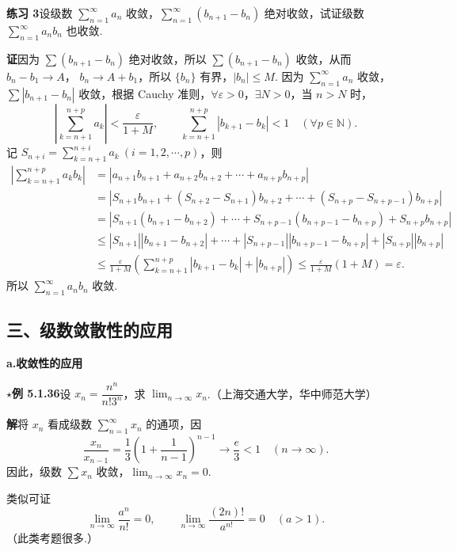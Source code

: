 \documentclass[UTF8, 12pt, fontset=fandol, oneside]{ctexart}
\begin{document}
\noindent\textbf{练习 3}\quad 设级数 $\displaystyle\sum_{n=1}^{\infty}a_n$ 收敛，$\displaystyle\sum_{n=1}^{\infty}(b_{n+1}-b_n)$ 绝对收敛，试证级数
$\displaystyle\sum_{n=1}^{\infty}a_nb_n$ 也收敛.

\noindent\textbf{证}\quad 因为 $\displaystyle\sum(b_{n+1}-b_n)$ 绝对收敛，所以
$\displaystyle\sum(b_{n+1}-b_n)$ 收敛，从而 $b_n-b_1\to A$，
$b_n\to A+b_1$，所以 $\{b_n\}$ 有界，$|b_n|\le M$. 因为
$\displaystyle\sum_{n=1}^{\infty}a_n$ 收敛，$\displaystyle\sum|b_{n+1}-b_n|$ 收敛，根据 Cauchy 准则，$\forall\varepsilon>0$，$\exists N>0$，当 $n>N$ 时，
\[
  \left|\sum_{k=n+1}^{n+p}a_k\right|<\frac{\varepsilon}{1+M},
  \qquad
  \sum_{k=n+1}^{n+p}|b_{k+1}-b_k|<1\quad(\forall p\in\mathbb N).
\]
记 $S_{n+i}=\displaystyle\sum_{k=n+1}^{n+i}a_k\ (i=1,2,\cdots,p)$，则
\[
\begin{aligned}
  \left|\sum_{k=n+1}^{n+p}a_kb_k\right|
  &=|a_{n+1}b_{n+1}+a_{n+2}b_{n+2}+\cdots+a_{n+p}b_{n+p}|\\
  &=|S_{n+1}b_{n+1}+(S_{n+2}-S_{n+1})b_{n+2}
     +\cdots+(S_{n+p}-S_{n+p-1})b_{n+p}|\\
  &=|S_{n+1}(b_{n+1}-b_{n+2})+\cdots
    +S_{n+p-1}(b_{n+p-1}-b_{n+p})+S_{n+p}b_{n+p}|\\
  &\le |S_{n+1}||b_{n+1}-b_{n+2}|+\cdots
    +|S_{n+p-1}||b_{n+p-1}-b_{n+p}|+|S_{n+p}||b_{n+p}|\\
  &\le \frac{\varepsilon}{1+M}
    \left(\sum_{k=n+1}^{n+p}|b_{k+1}-b_k|+|b_{n+p}|\right)
  \le\frac{\varepsilon}{1+M}(1+M)=\varepsilon.
\end{aligned}
\]
所以 $\displaystyle\sum_{n=1}^{\infty}a_nb_n$ 收敛.

\subsection*{三、级数敛散性的应用}

\noindent\textbf{a.\quad 收敛性的应用}

\noindent\textbf{$\star$例 5.1.36}\quad 设
$x_n=\dfrac{n^n}{n!3^n}$，求 $\displaystyle\lim_{n\to\infty}x_n$.（上海交通大学，华中师范大学）

\noindent\textbf{解}\quad 将 $x_n$ 看成级数 $\displaystyle\sum_{n=1}^{\infty}x_n$ 的通项，因
\[
  \frac{x_n}{x_{n-1}}=\frac13\left(1+\frac1{n-1}\right)^{n-1}
  \to\frac e3<1\quad(n\to\infty).
\]
因此，级数 $\sum x_n$ 收敛，$\displaystyle\lim_{n\to\infty}x_n=0$.

类似可证
\[
  \lim_{n\to\infty}\frac{a^n}{n!}=0,\qquad
  \lim_{n\to\infty}\frac{(2n)!}{a^{n!}}=0\quad(a>1).
\]
（此类考题很多.）
\end{document}
